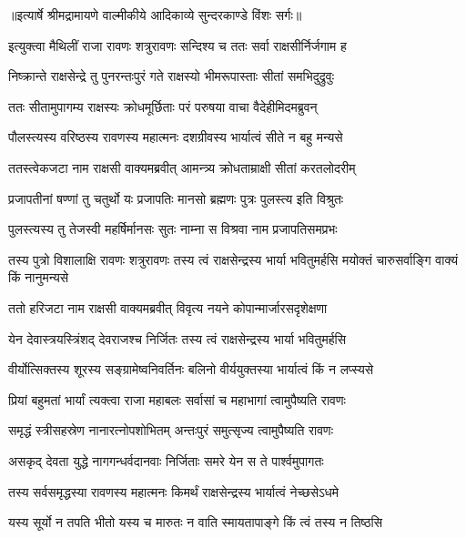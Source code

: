 {॥इत्यार्षे श्रीमद्रामायणे वाल्मीकीये आदिकाव्ये सुन्दरकाण्डे विंशः सर्गः॥}


\twolineshloka
{इत्युक्त्वा मैथिलीं राजा रावणः शत्रुरावणः}
{सन्दिश्य च ततः सर्वा राक्षसीर्निर्जगाम ह} %

\twolineshloka
{निष्क्रान्ते राक्षसेन्द्रे तु पुनरन्तःपुरं गते}
{राक्षस्यो भीमरूपास्ताः सीतां समभिदुद्रुवुः} %

\twolineshloka
{ततः सीतामुपागम्य राक्षस्यः क्रोधमूर्छिताः}
{परं परुषया वाचा वैदेहीमिदमब्रुवन्} %

\twolineshloka
{पौलस्त्यस्य वरिष्ठस्य रावणस्य महात्मनः}
{दशग्रीवस्य भार्यात्वं सीते न बहु मन्यसे} %

\twolineshloka
{ततस्त्वेकजटा नाम राक्षसी वाक्यमब्रवीत्}
{आमन्त्र्य क्रोधताम्राक्षी सीतां करतलोदरीम्} %

\twolineshloka
{प्रजापतीनां षण्णां तु चतुर्थो यः प्रजापतिः}
{मानसो ब्रह्मणः पुत्रः पुलस्त्य इति विश्रुतः} %

\twolineshloka
{पुलस्त्यस्य तु तेजस्वी महर्षिर्मानसः सुतः}
{नाम्ना स विश्रवा नाम प्रजापतिसमप्रभः} %

\threelineshloka
{तस्य पुत्रो विशालाक्षि रावणः शत्रुरावणः}
{तस्य त्वं राक्षसेन्द्रस्य भार्या भवितुमर्हसि}
{मयोक्तं चारुसर्वाङ्गि वाक्यं किं नानुमन्यसे} %

\twolineshloka
{ततो हरिजटा नाम राक्षसी वाक्यमब्रवीत्}
{विवृत्य नयने कोपान्मार्जारसदृशेक्षणा} %

\twolineshloka
{येन देवास्त्रयस्त्रिंशद् देवराजश्च निर्जितः}
{तस्य त्वं राक्षसेन्द्रस्य भार्या भवितुमर्हसि} %

\twolineshloka
{वीर्योत्सिक्तस्य शूरस्य सङ्ग्रामेष्वनिवर्तिनः}
{बलिनो वीर्ययुक्तस्या भार्यात्वं किं न लप्स्यसे} %

\twolineshloka
{प्रियां बहुमतां भार्यां त्यक्त्वा राजा महाबलः}
{सर्वासां च महाभागां त्वामुपैष्यति रावणः} %

\twolineshloka
{समृद्धं स्त्रीसहस्रेण नानारत्नोपशोभितम्}
{अन्तःपुरं समुत्सृज्य त्वामुपैष्यति रावणः} %

\twolineshloka
{असकृद् देवता युद्धे नागगन्धर्वदानवाः}
{निर्जिताः समरे येन स ते पार्श्वमुपागतः} %

\twolineshloka
{तस्य सर्वसमृद्धस्या रावणस्य महात्मनः}
{किमर्थं राक्षसेन्द्रस्य भार्यात्वं नेच्छसेऽधमे} %

\twolineshloka
{यस्य सूर्यो न तपति भीतो यस्य च मारुतः}
{न वाति स्मायतापाङ्गे किं त्वं तस्य न तिष्ठसि} %

